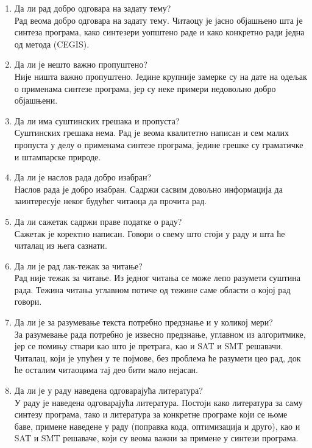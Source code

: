 \documentclass[a4paper]{report}
\begin{document}
\begin{enumerate}
\item Да ли рад добро одговара на задату тему?\\
Рад веома добро одговара на задату тему. Читаоцу је јасно објашњено шта је синтеза програма, како синтезери уопштено раде и како конкретно ради једна од метода (CEGIS).

\item Да ли је нешто важно пропуштено?\\
Није ништа важно пропуштено. Једине крупније замерке су на дате на одељак о применама синтезе програма, јер су неке примери недовољно добро објашњени.

\item Да ли има суштинских грешака и пропуста?\\
Суштинских грешака нема. Рад је веома квалитетно написан и сем малих пропуста у делу о применама синтезе програма, једине грешке су граматичке и штампарске природе.

\item Да ли је наслов рада добро изабран?\\
Наслов рада је добро изабран. Садржи сасвим довољно информација да заинтересује неког будућег читаоца да прочита рад.

\item Да ли сажетак садржи праве податке о раду?\\
Сажетак је коректно написан. Говори о свему што стоји у раду и шта ће читалац из њега сазнати.

\item Да ли је рад лак-тежак за читање?\\
Рад није тежак за читање. Из једног читања се може лепо разумети суштина рада. Тежина читања углавном потиче од тежине саме области о којој рад говори.

\item Да ли је за разумевање текста потребно предзнање и у коликој мери?\\
За разумевање рада потребно је извесно предзнање, углавном из алгоритмике, јер се помињу ствари као што је претрага, као и SAT и SMT решавачи. Читалац, који је упућен у те појмове, без проблема ће разумети цео рад, док ће осталим читаоцима тај део бити мало нејасан.

\item Да ли је у раду наведена одговарајућа литература?\\
У раду је наведена одговарајућа литература. Постоји како литература за саму синтезу програма, тако и литература за конкретне програме који се њоме баве, примене наведене у раду (поправка кода, оптимизација и друго), као и SAT и SMT решаваче, који су веома важни за примене у синтези програма.


\end{enumerate}
\end{document}
